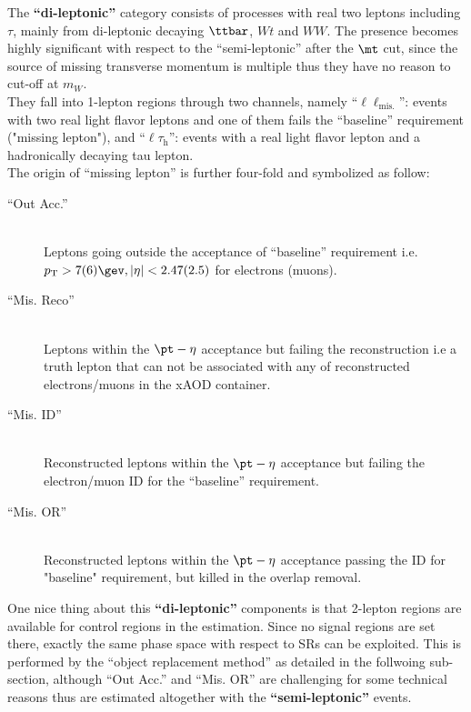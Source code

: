 The \textbf{``di-leptonic''} category consists of processes with real two leptons including $\tau$, mainly from di-leptonic decaying $\ttbar$, $Wt$ and $WW$. The presence becomes highly significant with respect to the ``semi-leptonic'' after the $\mt$ cut, since the source of missing transverse momentum is multiple thus they have no reason to cut-off at $m_{W}$.  \\
They fall into 1-lepton regions through two channels, namely ``$\ell\ell_{\mathrm{mis.}}$'': events with two real light flavor leptons and one of them fails the ``baseline'' requirement ("missing lepton"), and ``$\ell\tau_{\mathrm{h}}$'': events with a real light flavor lepton and a hadronically decaying tau lepton. \\
%
The origin of ``missing lepton'' is further four-fold and symbolized as follow: 
\begin{description}
\item [``Out Acc.''] \mbox{} \\
 Leptons going outside the acceptance of ``baseline'' requirement i.e. $p_{\mathrm{T}}>7(6)\gev, |\eta|<2.47(2.5)$ for electrons (muons).
\item [``Mis. Reco''] \mbox{} \\
 Leptons within the $\pt-\eta$ acceptance but failing the reconstruction i.e a truth lepton that can not be associated with any of reconstructed electrons/muons in the xAOD container.
\item [``Mis. ID''] \mbox{} \\
 Reconstructed leptons within the $\pt-\eta$ acceptance but failing the electron/muon ID for the ``baseline'' requirement.
\item [``Mis. OR''] \mbox{} \\
 Reconstructed leptons within the $\pt-\eta$ acceptance passing the ID for "baseline" requirement, but killed in the overlap removal. 
\end{description}

One nice thing about this \textbf{``di-leptonic''} components is that 2-lepton regions are available for control regions in the estimation. Since no signal regions are set there, exactly the same phase space with respect to SRs can be exploited. This is performed by the ``object replacement method'' as detailed in the follwoing sub-section, although ``Out Acc.'' and ``Mis. OR'' are challenging for some technical reasons thus are estimated altogether with the  \textbf{``semi-leptonic''} events. \\
%

